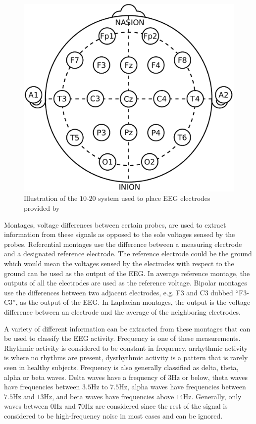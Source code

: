 \begin{figure}[!ht]
	\centering
	\includegraphics[height=0.45\linewidth]{pictures/tentwenty.pdf}
	\caption[Illustration of the $10$-$20$ system]{Illustration of the $10$-$20$ system used to place EEG electrodes provided by \citet{wiki:tentwenty}} \label{fig:tentwenty}
\end{figure}


Montages, voltage differences between certain probes, are used to extract information from these signals as opposed to the sole voltages sensed by the probes. Referential montages use the difference between a measuring electrode and a designated reference electrode. The reference electrode could be the ground which would mean the voltages sensed by the electrodes with respect to the ground can be used as the output of the EEG. In average reference montage, the outputs of all the electrodes are used as the reference voltage. Bipolar montages use the differences between two adjacent electrodes, e.g. F3 and C3 dubbed ``F3-C3'', as the output of the EEG. In Laplacian montages, the output is the voltage difference between an electrode and the average of the neighboring electrodes. 

A variety of different information can be extracted from these montages that can be used to classify the EEG activity. Frequency is one of these measurements. Rhythmic activity is considered to be constant in frequency, arrhythmic activity is where no rhythms are present, dysrhythmic activity is a pattern that is rarely seen in healthy subjects. Frequency is also generally classified as delta, theta, alpha or beta waves. Delta waves have a frequency of $3$Hz or below, theta waves have frequencies between $3.5$Hz to $7.5$Hz, alpha waves have frequencies between $7.5$Hz and $13$Hz, and beta waves have frequencies above $14$Hz. Generally, only waves between $0$Hz and $70$Hz are considered since the rest of the signal is considered to be high-frequency noise in most cases and can be ignored.

